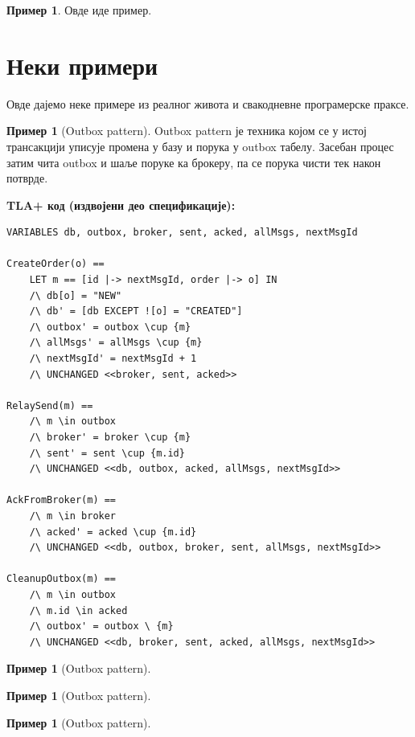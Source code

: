 \documentclass[12pt, a4paper]{article}
\theoremstyle{plain}
\theoremstyle{definition}
\newtheorem{primer}[teorema]{Пример}
\theoremstyle{remark}
\begin{document}
\begin{primer}
    Овде иде пример.
\end{primer}

\section{Неки примери}
Овде дајемо неке примере из реалног живота и свакодневне програмерске праксе.
\begin{primer}[Outbox pattern]
Outbox pattern је техника којом се у истој трансакцији уписује промена у базу и порука у outbox табелу.
Засебан процес затим чита outbox и шаље поруке ка брокеру, па се порука чисти тек након потврде.

\textbf{TLA+ код (издвојени део спецификације):}
\begin{lstlisting}
VARIABLES db, outbox, broker, sent, acked, allMsgs, nextMsgId

CreateOrder(o) ==
    LET m == [id |-> nextMsgId, order |-> o] IN
    /\ db[o] = "NEW"
    /\ db' = [db EXCEPT ![o] = "CREATED"]
    /\ outbox' = outbox \cup {m}
    /\ allMsgs' = allMsgs \cup {m}
    /\ nextMsgId' = nextMsgId + 1
    /\ UNCHANGED <<broker, sent, acked>>

RelaySend(m) ==
    /\ m \in outbox
    /\ broker' = broker \cup {m}
    /\ sent' = sent \cup {m.id}
    /\ UNCHANGED <<db, outbox, acked, allMsgs, nextMsgId>>

AckFromBroker(m) ==
    /\ m \in broker
    /\ acked' = acked \cup {m.id}
    /\ UNCHANGED <<db, outbox, broker, sent, allMsgs, nextMsgId>>

CleanupOutbox(m) ==
    /\ m \in outbox
    /\ m.id \in acked
    /\ outbox' = outbox \ {m}
    /\ UNCHANGED <<db, broker, sent, acked, allMsgs, nextMsgId>>
\end{lstlisting}
\end{primer}

\begin{primer}[Outbox pattern]

\end{primer}

\begin{primer}[Outbox pattern]

\end{primer}

\begin{primer}[Outbox pattern]

\end{primer}
\end{document}
